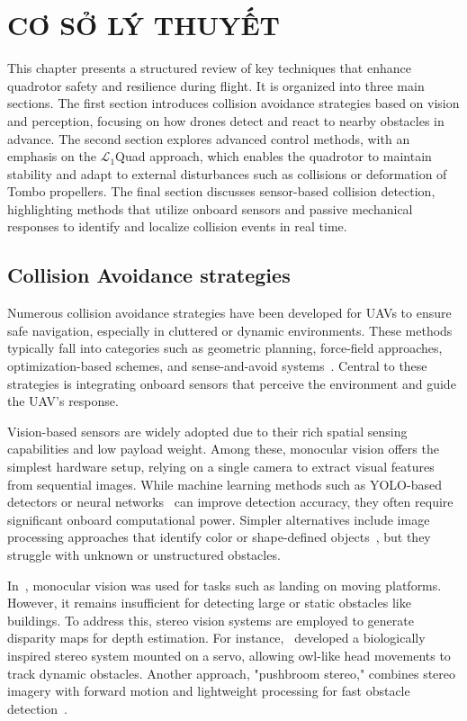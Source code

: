 \chapter{CƠ SỞ LÝ THUYẾT} \label{chap:background}

This chapter presents a structured review of key techniques that enhance quadrotor safety and resilience during flight. It is organized into three main sections. The first section introduces collision avoidance strategies based on vision and perception, focusing on how drones detect and react to nearby obstacles in advance. The second section explores advanced control methods, with an emphasis on the $\mathcal{L}_1$Quad approach, which enables the quadrotor to maintain stability and adapt to external disturbances such as collisions or deformation of Tombo propellers. The final section discusses sensor-based collision detection, highlighting methods that utilize onboard sensors and passive mechanical responses to identify and localize collision events in real time.

\section{Collision Avoidance strategies}
Numerous collision avoidance strategies have been developed for \gls{UAV}s to ensure safe navigation, especially in cluttered or dynamic environments. These methods typically fall into categories such as geometric planning, force-field approaches, optimization-based schemes, and sense-and-avoid systems~\cite{avoidancetypes,avoidancetypes2}. Central to these strategies is integrating onboard sensors that perceive the environment and guide the \gls{UAV}’s response.

Vision-based sensors are widely adopted due to their rich spatial sensing capabilities and low payload weight. Among these, monocular vision offers the simplest hardware setup, relying on a single camera to extract visual features from sequential images. While machine learning methods such as YOLO-based detectors or neural networks~\cite{YoloFastest} can improve detection accuracy, they often require significant onboard computational power. Simpler alternatives include image processing approaches that identify color or shape-defined objects~\cite{monocolor}, but they struggle with unknown or unstructured obstacles. 

In~\cite{monocularcamera}, monocular vision was used for tasks such as landing on moving platforms. However, it remains insufficient for detecting large or static obstacles like buildings. To address this, stereo vision systems are employed to generate disparity maps for depth estimation. For instance,~\cite{avoidancetypes} developed a biologically inspired stereo system mounted on a servo, allowing owl-like head movements to track dynamic obstacles. Another approach, "pushbroom stereo," combines stereo imagery with forward motion and lightweight processing for fast obstacle detection~\cite{pushbroom}.